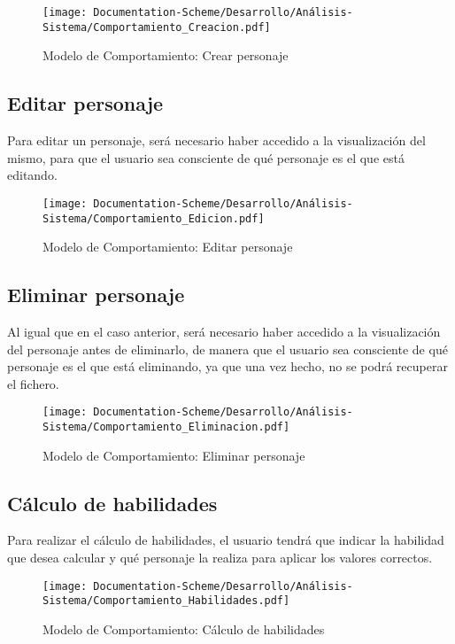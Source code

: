 \begin{figure}[H]
    \centering
    \texttt{[image: Documentation-Scheme/Desarrollo/Análisis-Sistema/Comportamiento\_Creacion.pdf]}
    \caption{Modelo de Comportamiento: Crear personaje}
    \label{Comportamiento_creacion_personaje}
\end{figure}
\newpage
\subsection{Editar personaje}
Para editar un personaje, será necesario haber accedido a la visualización del mismo, para que 
el usuario sea consciente de qué personaje es el que está editando.

\begin{figure}[H]
    \centering
    \texttt{[image: Documentation-Scheme/Desarrollo/Análisis-Sistema/Comportamiento\_Edicion.pdf]}
    \caption{Modelo de Comportamiento: Editar personaje}
    \label{Comportamiento_edicion_personaje}
\end{figure}

\subsection{Eliminar personaje}
Al igual que en el caso anterior, será necesario haber accedido a la visualización del personaje antes de 
eliminarlo, de manera que el usuario sea consciente de qué personaje es el que está eliminando, ya que 
una vez hecho, no se podrá recuperar el fichero.

\begin{figure}[H]
    \centering
    \texttt{[image: Documentation-Scheme/Desarrollo/Análisis-Sistema/Comportamiento\_Eliminacion.pdf]}
    \caption{Modelo de Comportamiento: Eliminar personaje}
    \label{Comportamiento_eliminacion_personaje}
\end{figure}
\newpage

\subsection{Cálculo de habilidades}
Para realizar el cálculo de habilidades, el usuario tendrá que indicar la habilidad que desea calcular 
y qué personaje la realiza para aplicar los valores correctos.

\begin{figure}[H]
    \centering
    \texttt{[image: Documentation-Scheme/Desarrollo/Análisis-Sistema/Comportamiento\_Habilidades.pdf]}
    \caption{Modelo de Comportamiento: Cálculo de habilidades}
    \label{Comportamiento_habilidades}
\end{figure}